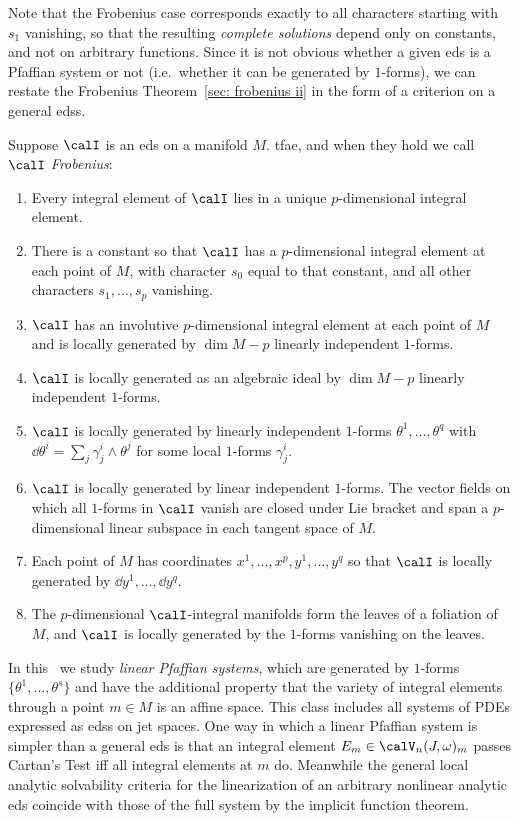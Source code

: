 Note that the Frobenius case corresponds exactly to all characters starting with $s_1$ vanishing, so that the resulting \emph{complete solutions} depend only on constants, and not on arbitrary functions. Since it is not obvious whether a given \gls{eds} is a Pfaffian system or not (i.e.\ whether it can be generated by $1$-forms), we can restate the Frobenius Theorem~\ref{sec: frobenius ii} in the form of a criterion on a general \glspl{eds}.

\begin{thm}\label{thm frobenius iii}
    Suppose $\calI$ is an \gls{eds} on a manifold $M$. \gls{tfae}, and when they hold we call $\calI$ \emph{Frobenius}:
    \begin{enumerate}
        \item Every integral element of $\calI$ lies in a unique $p$-dimensional integral element.
        \item There is a constant so that $\calI$ has a $p$-dimensional integral element at each point of $M$, with character $s_0$ equal to that constant, and all other characters $s_1,\ldots,s_p$ vanishing.
        \item $\calI$ has an involutive $p$-dimensional integral element at each point of $M$ and is locally generated by $\dim M-p$ linearly independent $1$-forms.
        \item $\calI$ is locally generated as an algebraic ideal by $\dim M-p$ linearly independent $1$-forms.
        \item $\calI$ is locally generated by linearly independent $1$-forms $\theta^1,\ldots,\theta^q$ with $\dd\theta^i=\sum_j \gamma_j^i\wedge\theta^j$ for some local $1$-forms $\gamma^i_j$.
        \item $\calI$ is locally generated by linear independent $1$-forms. The vector fields on which all $1$-forms in $\calI$ vanish are closed under Lie bracket and span a $p$-dimensional linear subspace in each tangent space of $M$.
        \item Each point of $M$ has coordinates $x^1,\ldots,x^p,y^1,\ldots,y^q$ so that $\calI$ is locally generated by $\dd y^1,\ldots,\dd y^q$.
        \item The $p$-dimensional $\calI$-integral manifolds form the leaves of a foliation of $M$, and $\calI$ is locally generated by the $1$-forms vanishing on the leaves.
    \end{enumerate}
\end{thm}


In this \subsect\ we study \emph{linear Pfaffian systems}, which are generated by $1$-forms $\{\theta^1,\ldots,\theta^s\}$ and have the additional property that the variety of integral elements through a point $m\in M$ is an affine space. This class includes all systems of PDEs expressed as \glspl{eds} on jet spaces. One way in which a linear Pfaffian system is simpler than a general \gls{eds} is that an integral element $E_m\in\calV_n(J,\omega)_m$ passes Cartan's Test iff all integral elements at $m$ do. Meanwhile the general local analytic solvability criteria for the linearization of an arbitrary  nonlinear analytic \gls{eds} coincide with those of the full system by the implicit function theorem.


